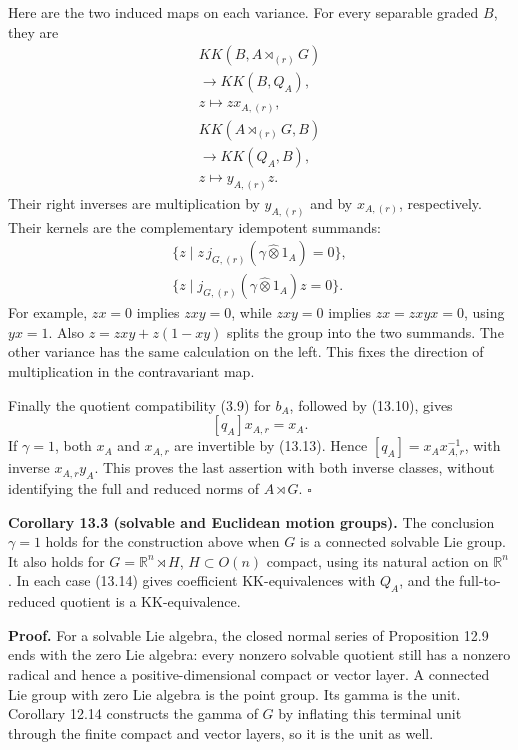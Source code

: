 \documentclass[
  11pt,
]{article}
\begin{document}
Here are the two induced maps on each variance. For every separable
graded \(B\), they are \[
\begin{gathered}
KK(B,A\rtimes_{(r)}G)\\
\longrightarrow KK(B,Q_A),\\
z\longmapsto zx_{A,(r)},\\
KK(A\rtimes_{(r)}G,B)\\
\longrightarrow KK(Q_A,B),\\
z\longmapsto y_{A,(r)}z.
\end{gathered}
\tag{13.15}
\] Their right inverses are multiplication by \(y_{A,(r)}\) and by
\(x_{A,(r)}\), respectively. Their kernels are the complementary
idempotent summands: \[
\begin{gathered}
\{z\mid z\,j_{G,(r)}(\gamma\widehat\otimes1_A)=0\},\\
\{z\mid j_{G,(r)}(\gamma\widehat\otimes1_A)z=0\}.
\end{gathered}
\tag{13.16}
\] For example, \(zx=0\) implies \(zxy=0\), while \(zxy=0\) implies
\(zx=zxyx=0\), using \(yx=1\). Also \(z=zxy+z(1-xy)\) splits the group
into the two summands. The other variance has the same calculation on
the left. This fixes the direction of multiplication in the
contravariant map.

Finally the quotient compatibility (3.9) for \(b_A\), followed by
(13.10), gives \[
[q_A]x_{A,r}=x_A.
\tag{13.17}
\] If \(\gamma=1\), both \(x_A\) and \(x_{A,r}\) are invertible by
(13.13). Hence \([q_A]=x_Ax_{A,r}^{-1}\), with inverse \(x_{A,r}y_A\).
This proves the last assertion with both inverse classes, without
identifying the full and reduced norms of \(A\rtimes G\). \(\square\)

\textbf{Corollary 13.3 (solvable and Euclidean motion groups).} The
conclusion \(\gamma=1\) holds for the construction above when \(G\) is a
connected solvable Lie group. It also holds for
\(G=\mathbb R^n\rtimes H\), \(H\subset O(n)\) compact, using its natural
action on \(\mathbb R^n\). In each case (13.14) gives coefficient
KK-equivalences with \(Q_A\), and the full-to-reduced quotient is a
KK-equivalence.

\textbf{Proof.} For a solvable Lie algebra, the closed normal series of
Proposition 12.9 ends with the zero Lie algebra: every nonzero solvable
quotient still has a nonzero radical and hence a positive-dimensional
compact or vector layer. A connected Lie group with zero Lie algebra is
the point group. Its gamma is the unit. Corollary 12.14 constructs the
gamma of \(G\) by inflating this terminal unit through the finite
compact and vector layers, so it is the unit as well.
\end{document}
